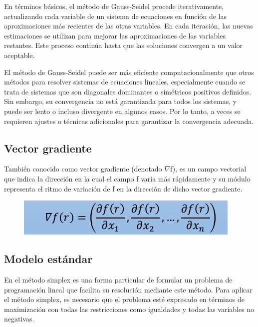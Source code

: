 \documentclass[conference]{IEEEtran}
\begin{document}
En términos básicos, el método de Gauss-Seidel procede iterativamente,
actualizando cada variable de un sistema de ecuaciones en función de las
aproximaciones más recientes de las otras variables. En cada iteración, las
nuevas estimaciones se utilizan para mejorar las aproximaciones de las
variables restantes. Este proceso continúa hasta que las soluciones convergen
a un valor aceptable.

El método de Gauss-Seidel puede ser más eficiente computacionalmente que
otros métodos para resolver sistemas de ecuaciones lineales, especialmente
cuando se trata de sistemas que son diagonales dominantes o simétricos
positivos definidos. Sin embargo, su convergencia no está garantizada para
todos los sistemas, y puede ser lento o incluso divergente en algunos casos.
Por lo tanto, a veces se requieren ajustes o técnicas adicionales para
garantizar la convergencia adecuada.

\subsection{Vector gradiente}

También conocido como vector gradiente (denotado $\nabla$f), es un
campo vectorial que indica la dirección en la cual el campo f varía más
rápidamente y su módulo representa el ritmo de variación de f en la dirección
de dicho vector gradiente.

\begin{figure}[H]
    \begin{center}
        \includegraphics[width=\linewidth]{./Images/VectorGradiente.png}
        \caption{}
    \end{center}
\end{figure}

\subsection{Modelo estándar}

En el método simplex es una forma particular de formular un problema de
programación lineal que facilita su resolución mediante este método. Para
aplicar el método simplex, es necesario que el problema esté expresado en
términos de maximización con todas las restricciones como igualdades y todas
las variables no negativas.
\end{document}
